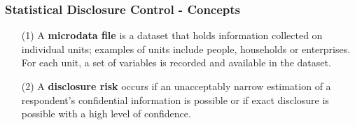 \documentclass{beamer}
\begin{document}
\begin{frame}
	\frametitle{Statistical Disclosure Control - Concepts}
	\Large
	\begin{itemize}
		\item[(1)] 	
		A \textbf{microdata file} is a dataset that holds information collected on individual units;
		examples of units include people, households or enterprises.\\ For each unit, a set of
		variables is recorded and available in the dataset.
		\item[(2)] A \textbf{disclosure risk} occurs if an unacceptably narrow estimation of a respondent’s confidential information is possible or if exact disclosure is possible with a high level of confidence.
	\end{itemize}
\end{frame}
\end{document}
